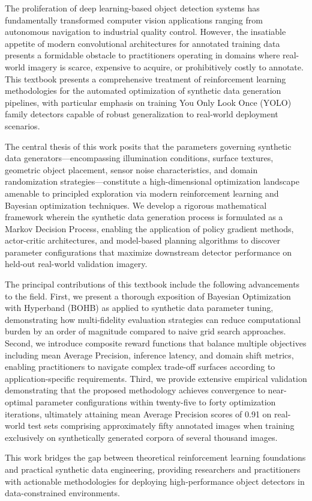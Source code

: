 The proliferation of deep learning-based object detection systems has fundamentally transformed computer vision applications ranging from autonomous navigation to industrial quality control. However, the insatiable appetite of modern convolutional architectures for annotated training data presents a formidable obstacle to practitioners operating in domains where real-world imagery is scarce, expensive to acquire, or prohibitively costly to annotate. This textbook presents a comprehensive treatment of reinforcement learning methodologies for the automated optimization of synthetic data generation pipelines, with particular emphasis on training You Only Look Once (YOLO) family detectors capable of robust generalization to real-world deployment scenarios.

The central thesis of this work posits that the parameters governing synthetic data generators---encompassing illumination conditions, surface textures, geometric object placement, sensor noise characteristics, and domain randomization strategies---constitute a high-dimensional optimization landscape amenable to principled exploration via modern reinforcement learning and Bayesian optimization techniques. We develop a rigorous mathematical framework wherein the synthetic data generation process is formulated as a Markov Decision Process, enabling the application of policy gradient methods, actor-critic architectures, and model-based planning algorithms to discover parameter configurations that maximize downstream detector performance on held-out real-world validation imagery.

The principal contributions of this textbook include the following advancements to the field. First, we present a thorough exposition of Bayesian Optimization with Hyperband (BOHB) as applied to synthetic data parameter tuning, demonstrating how multi-fidelity evaluation strategies can reduce computational burden by an order of magnitude compared to naive grid search approaches. Second, we introduce composite reward functions that balance multiple objectives including mean Average Precision, inference latency, and domain shift metrics, enabling practitioners to navigate complex trade-off surfaces according to application-specific requirements. Third, we provide extensive empirical validation demonstrating that the proposed methodology achieves convergence to near-optimal parameter configurations within twenty-five to forty optimization iterations, ultimately attaining mean Average Precision scores of 0.91 on real-world test sets comprising approximately fifty annotated images when training exclusively on synthetically generated corpora of several thousand images.

This work bridges the gap between theoretical reinforcement learning foundations and practical synthetic data engineering, providing researchers and practitioners with actionable methodologies for deploying high-performance object detectors in data-constrained environments.
